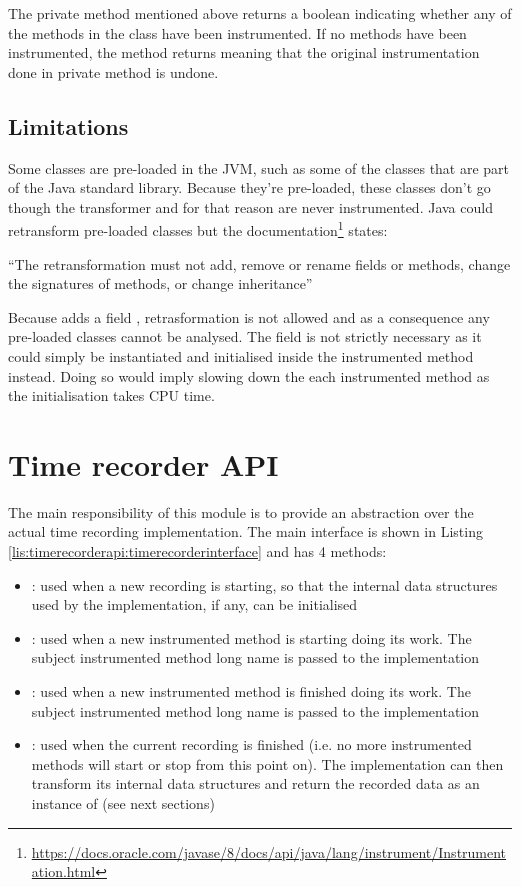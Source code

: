 \noindent The private method  mentioned above returns a boolean indicating whether any of the methods in the class have been instrumented. If no methods have been instrumented, the  method returns  meaning that the original instrumentation done in private method  is undone.

\subsection{Limitations}
\label{sec:implementation:agent:limitations}
Some classes are pre-loaded in the JVM, such as some of the classes that are part of the Java standard library. Because they're pre-loaded, these classes don't go though the transformer and for that reason are never instrumented. Java could retransform pre-loaded classes but the documentation\footnote{\url{https://docs.oracle.com/javase/8/docs/api/java/lang/instrument/Instrumentation.html}} states:

\enquote{The retransformation must not add, remove or rename fields or methods, change the signatures of methods, or change inheritance}

\noindent Because  adds a field , retrasformation is not allowed and as a consequence any pre-loaded classes cannot be analysed. The field is not strictly necessary as it could simply be instantiated and initialised inside the instrumented method instead. Doing so would imply slowing down the each instrumented method as the initialisation takes CPU time.

\section{Time recorder API}
\label{sec:implementation:timerecorderapi}
The main responsibility of this module is to provide an abstraction over the actual time recording implementation. The main interface is shown in Listing \ref{lis:timerecorderapi:timerecorderinterface} and has 4 methods:
\begin{itemize}
  \item \textbf{}: used when a new recording is starting, so that the internal data structures used by the implementation, if any, can be initialised
  \item \textbf{}: used when a new instrumented method is starting doing its work. The subject instrumented method long name is passed to the implementation
  \item \textbf{}: used when a new instrumented method is finished doing its work. The subject instrumented method long name is passed to the implementation
  \item \textbf{}: used when the current recording is finished (i.e. no more instrumented methods will start or stop from this point on). The implementation can then transform its internal data structures and return the recorded data as an instance of  (see next sections)
\end{itemize}

